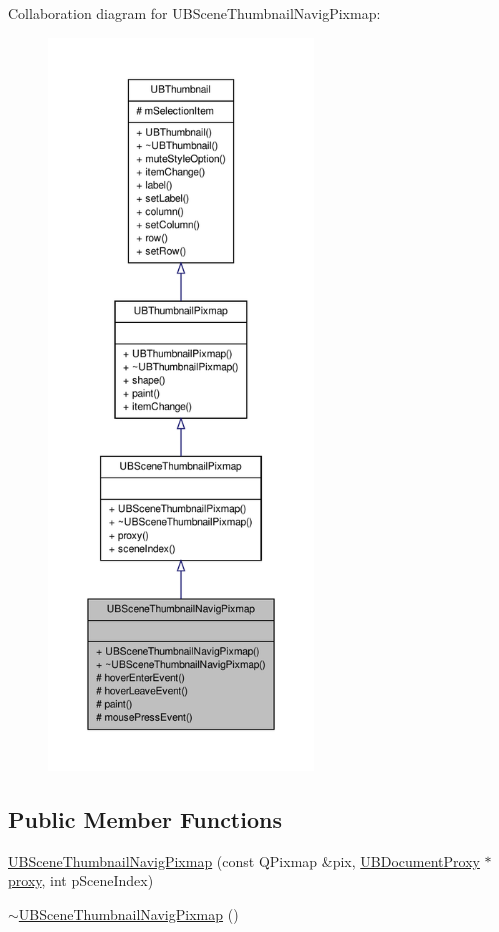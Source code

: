 Collaboration diagram for U\-B\-Scene\-Thumbnail\-Navig\-Pixmap\-:
\nopagebreak
\begin{figure}[H]
\begin{center}
\leavevmode
\includegraphics[height=550pt]{d7/dcc/class_u_b_scene_thumbnail_navig_pixmap__coll__graph}
\end{center}
\end{figure}
\subsection*{Public Member Functions}
\begin{DoxyCompactItemize}
\item 
\hyperlink{class_u_b_scene_thumbnail_navig_pixmap_ae3f37c84b87c05513db49e5a6d75697f}{U\-B\-Scene\-Thumbnail\-Navig\-Pixmap} (const Q\-Pixmap \&pix, \hyperlink{class_u_b_document_proxy}{U\-B\-Document\-Proxy} $\ast$\hyperlink{class_u_b_scene_thumbnail_pixmap_ae7da44d7a27c5ed55eb753200fcd8d2e}{proxy}, int p\-Scene\-Index)
\item 
\hyperlink{class_u_b_scene_thumbnail_navig_pixmap_a07d0765e6935673c4d4259b42896939f}{$\sim$\-U\-B\-Scene\-Thumbnail\-Navig\-Pixmap} ()
\end{DoxyCompactItemize}
